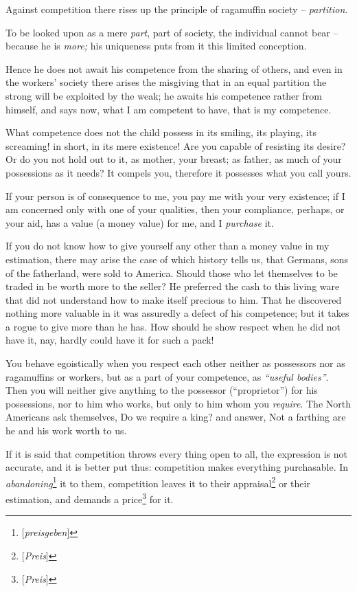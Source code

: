 Against competition there rises up the principle of ragamuffin society -- 
\textit{partition}.

To be looked upon as a mere \textit{part}, part of society, the individual 
cannot bear -- because he is \textit{more;} his uniqueness puts from it this 
limited conception.

Hence he does not await his competence from the sharing of others, and even in 
the workers' society there arises the misgiving that in an equal partition the 
strong will be exploited by the weak; he awaits his competence rather from 
himself, and says now, what I am competent to have, that is my competence.

What competence does not the child possess in its smiling, its playing, its 
screaming! in short, in its mere existence! Are you capable of resisting its 
desire? Or do you not hold out to it, as mother, your breast; as father, as 
much of your possessions as it needs? It compels you, therefore it possesses 
what you call yours.

If your person is of consequence to me, you pay me with your very existence; 
if I am concerned only with one of your qualities, then your compliance, 
perhaps, or your aid, has a value (a money value) for me, and I 
\textit{purchase} it.

If you do not know how to give yourself any other than a money value in my 
estimation, there may arise the case of which history tells us, that Germans, 
sons of the fatherland, were sold to America. Should those who let themselves 
to be traded in be worth more to the seller? He preferred the cash to this 
living ware that did not understand how to make itself precious to him. That 
he discovered nothing more valuable in it was assuredly a defect of his 
competence; but it takes a rogue to give more than he has. How should he show 
respect when he did not have it, nay, hardly could have it for such a pack!

You behave egoistically when you respect each other neither as possessors nor 
as ragamuffins or workers, but as a part of your competence, as 
\textit{``useful bodies''}. Then you will neither give anything to the 
possessor (``proprietor'') for his possessions, nor to him who works, but 
only to him whom you \textit{require}. The North Americans ask themselves, Do 
we require a king? and answer, Not a farthing are he and his work worth to us.

If it is said that competition throws every thing open to all, the expression 
is not accurate, and it is better put thus: competition makes everything 
purchasable. In \textit{abandoning}\footnote{[\textit{preisgeben}]} it to 
them, competition leaves it to their appraisal\footnote{[\textit{Preis}]} or 
their estimation, and demands a price\footnote{[\textit{Preis}]} for it.

